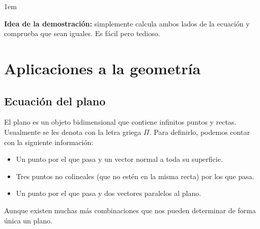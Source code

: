 \documentclass[12pt, fleqn]{report}                             %
\newenvironment{SmallIndentation}[1][0.75em]                    %
    {\begin{adjustwidth}{#1}{}\begin{footnotesize}}                 %
    {\end{footnotesize}\end{adjustwidth}}                           %
\begin{document}
            	\begin{SmallIndentation}[1em]
            		\textbf{Idea de la demostración:} simplemente calcula ambos lados de la ecuación y comprueba que sean iguales. Es fácil pero tedioso.
            	\end{SmallIndentation}
            
            
            
            
    
    
            
            
    \chapter{Aplicaciones a la geometría}
    
        
        \section{Ecuación del plano}
        
        El plano es un objeto bidimensional que contiene infinitos puntos y rectas. Usualmente se les denota con la letra griega $\Pi$. Para definirlo, podemos contar con la siguiente información: \begin{itemize}\setlength\itemsep{0em}
	        \item Un punto por el que pasa y un vector normal a toda su superficie.
	        \item Tres puntos no colineales (que no estén en la misma recta) por los que pasa.
	        \item Un punto por el que pasa y dos vectores paralelos al plano.
        \end{itemize}
    
    	Aunque existen muchas más combinaciones que nos pueden determinar de forma única un plano.
    
    
\end{document}
